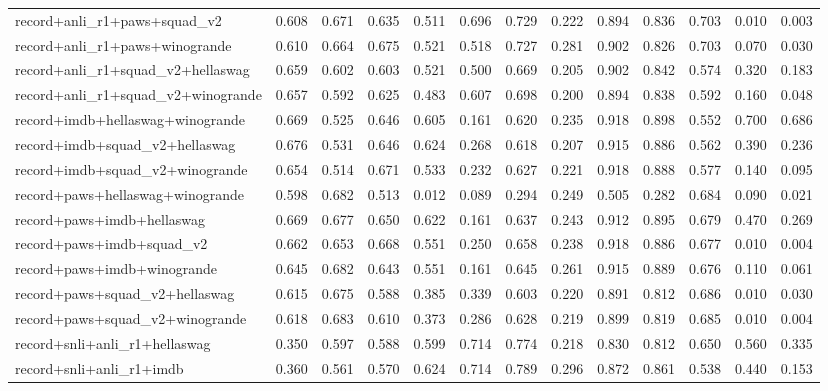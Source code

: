 \begin{table}[t]
\begin{tabular}{lrrrrrrrrrrrr}
    record+anli\_r1+paws+squad\_v2 & 0.608 & 0.671 & 0.635 & 0.511 & 0.696 & 0.729 & 0.222 & 0.894 & 0.836 & 0.703 & 0.010 & 0.003 \\
    record+anli\_r1+paws+winogrande & 0.610 & 0.664 & 0.675 & 0.521 & 0.518 & 0.727 & 0.281 & 0.902 & 0.826 & 0.703 & 0.070 & 0.030 \\
    record+anli\_r1+squad\_v2+hellaswag & 0.659 & 0.602 & 0.603 & 0.521 & 0.500 & 0.669 & 0.205 & 0.902 & 0.842 & 0.574 & 0.320 & 0.183 \\
    record+anli\_r1+squad\_v2+winogrande & 0.657 & 0.592 & 0.625 & 0.483 & 0.607 & 0.698 & 0.200 & 0.894 & 0.838 & 0.592 & 0.160 & 0.048 \\
    record+imdb+hellaswag+winogrande & 0.669 & 0.525 & 0.646 & 0.605 & 0.161 & 0.620 & 0.235 & 0.918 & 0.898 & 0.552 & 0.700 & 0.686 \\
    record+imdb+squad\_v2+hellaswag & 0.676 & 0.531 & 0.646 & 0.624 & 0.268 & 0.618 & 0.207 & 0.915 & 0.886 & 0.562 & 0.390 & 0.236 \\
    record+imdb+squad\_v2+winogrande & 0.654 & 0.514 & 0.671 & 0.533 & 0.232 & 0.627 & 0.221 & 0.918 & 0.888 & 0.577 & 0.140 & 0.095 \\
    record+paws+hellaswag+winogrande & 0.598 & 0.682 & 0.513 & 0.012 & 0.089 & 0.294 & 0.249 & 0.505 & 0.282 & 0.684 & 0.090 & 0.021 \\
    record+paws+imdb+hellaswag & 0.669 & 0.677 & 0.650 & 0.622 & 0.161 & 0.637 & 0.243 & 0.912 & 0.895 & 0.679 & 0.470 & 0.269 \\
    record+paws+imdb+squad\_v2 & 0.662 & 0.653 & 0.668 & 0.551 & 0.250 & 0.658 & 0.238 & 0.918 & 0.886 & 0.677 & 0.010 & 0.004 \\
    record+paws+imdb+winogrande & 0.645 & 0.682 & 0.643 & 0.551 & 0.161 & 0.645 & 0.261 & 0.915 & 0.889 & 0.676 & 0.110 & 0.061 \\
    record+paws+squad\_v2+hellaswag & 0.615 & 0.675 & 0.588 & 0.385 & 0.339 & 0.603 & 0.220 & 0.891 & 0.812 & 0.686 & 0.010 & 0.030 \\
    record+paws+squad\_v2+winogrande & 0.618 & 0.683 & 0.610 & 0.373 & 0.286 & 0.628 & 0.219 & 0.899 & 0.819 & 0.685 & 0.010 & 0.004 \\
    record+snli+anli\_r1+hellaswag & 0.350 & 0.597 & 0.588 & 0.599 & 0.714 & 0.774 & 0.218 & 0.830 & 0.812 & 0.650 & 0.560 & 0.335 \\
    record+snli+anli\_r1+imdb & 0.360 & 0.561 & 0.570 & 0.624 & 0.714 & 0.789 & 0.296 & 0.872 & 0.861 & 0.538 & 0.440 & 0.153 \\

\end{tabular}
\end{table}
